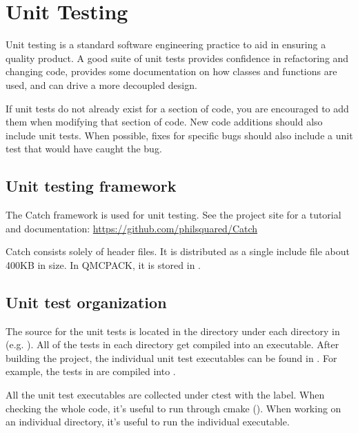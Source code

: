 \chapter{Unit Testing}
\label{chap:unit_testing}

Unit testing is a standard software engineering practice to aid in ensuring a quality product. A good suite of unit tests provides confidence in refactoring and changing code, provides some documentation on how classes and functions are used, and can drive a more decoupled design.

If unit tests do not already exist for a section of code, you are encouraged to add them when modifying that section of code.  New code additions should also include unit tests.
When possible, fixes for specific bugs should also include a unit test that would have caught the bug.

\section {Unit testing framework} The Catch framework is used for unit testing.
See the project site for a tutorial and documentation: \url{https://github.com/philsquared/Catch}

Catch consists solely of header files. It is distributed as a single include file about 400KB in size.  In QMCPACK, it is stored in .

\section{Unit test organization}

\begin{sloppypar}
The source for the unit tests is located in the  directory under each directory in  (e.g. ).
All of the tests in each  directory get compiled into an executable.
After building the project, the individual unit test executables can be found in .
For example, the tests in  are compiled into .
\end{sloppypar}

All the unit test executables are collected under ctest with the  label.
When checking the whole code, it's useful to run through cmake ().
When working on an individual directory, it's useful to run the individual executable.

